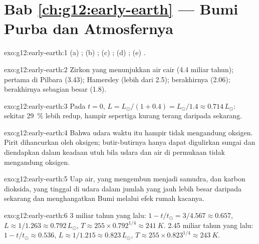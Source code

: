 \section*{Bab \ref{ch:g12:early-earth} --- Bumi Purba dan Atmosfernya}

\begin{solution}{exo:g12:early-earth:1}
(a) ; (b) ; (c) ; (d) ; (e) .
\end{solution}

\begin{solution}{exo:g12:early-earth:2}
Zirkon yang menunjukkan air cair (4.4 miliar tahun);  pertama di
Pilbara (3.43);  Hamersley (lebih dari 2.5); berakhirnya
 (2.06); berakhirnya sebagian besar  (1.8).
\end{solution}

\begin{solution}{exo:g12:early-earth:3}
Pada $t = 0$, $L = L_\odot/(1 + 0.4) = L_\odot/1.4 \approx 0.714\,L_\odot$:
sekitar \qty{29}{\percent} lebih redup, hampir sepertiga kurang terang
daripada sekarang.
\end{solution}

\begin{solution}{exo:g12:early-earth:4}
Bahwa udara waktu itu hampir tidak mengandung oksigen. Pirit dihancurkan oleh
oksigen; butir-butirnya hanya dapat digulirkan sungai dan diendapkan dalam
keadaan utuh bila udara dan air di permukaan tidak mengandung oksigen.
\end{solution}

\begin{solution}{exo:g12:early-earth:5}
Uap air, yang mengembun menjadi samudra, dan karbon dioksida, yang tinggal di
udara dalam jumlah yang jauh lebih besar daripada sekarang dan menghangatkan
Bumi melalui efek rumah kacanya.
\end{solution}

\begin{solution}{exo:g12:early-earth:6}
3 miliar tahun yang lalu: $1 - t/t_\odot = 3/4.567 \approx 0.657$, $L \approx
1/1.263 \approx 0.792\,L_\odot$, $T \approx 255 \times 0.792^{1/4} \approx
\qty{241}{K}$. 2.45 miliar tahun yang lalu: $1 - t/t_\odot \approx 0.536$, $L
\approx 1/1.215 \approx 0.823\,L_\odot$, $T \approx 255 \times 0.823^{1/4}
\approx \qty{243}{K}$.
\end{solution}

